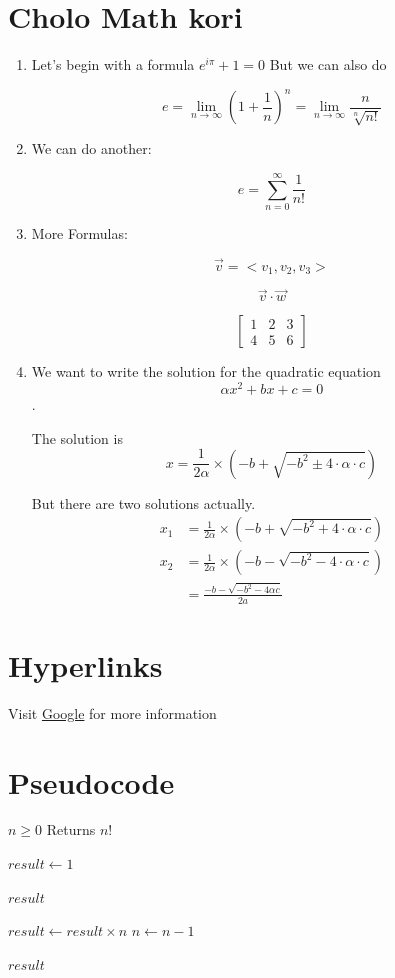 \documentclass{article}
\begin{document}
\section{Cholo Math kori}
\begin{enumerate}
\item Let's begin with a formula $e^{i\pi} + 1 = 0$ But we can also do

$$ e = \lim_{n\to\infty} \left(1+\frac{1}{n}\right)^n = \lim_{n\to\infty}\frac{n}{\sqrt[n]{n!}}$$

\item We can do another:

$$ e = \sum_{n=0}^{\infty}\frac{1}{n!}$$

\item More Formulas:

$$  \vec{v} = <v_1,v_2,v_3>$$

$$\vec{v}\cdot \vec{w}$$

$$\begin{bmatrix}
    1 & 2 & 3 \\
    4 & 5 & 6
\end{bmatrix}$$

\item We want to write the solution for the quadratic equation $$\alpha x^2 + bx + c = 0$$. 

The solution is 
$$ x = \frac{1}{2\alpha} \times \left(-b + \sqrt{-b^2 \pm 4\cdot \alpha \cdot c}\right) $$

But there are two solutions actually.
\begin{align*}
 x_1 & = \frac{1}{2\alpha} \times \left(-b + \sqrt{-b^2 + 4\cdot \alpha \cdot c}\right)  \\ 
 x_2 & = \frac{1}{2\alpha} \times \left(-b - \sqrt{-b^2 - 4\cdot \alpha \cdot c}\right) \\
 & = \frac{-b - \sqrt{-b^2 - 4 \alpha c}}{2a}
\end{align*}
\end{enumerate}

\section{Hyperlinks}
Visit \href{www.google.com}{Google} for more information

\section{Pseudocode}
\begin{algorithm}[ht]
\caption{Calculate Factorial}
\label{alg:factorial}
\begin{algorithmic}[1] %
    \Require $n \geq 0$
    \Ensure Returns $n!$
    
    \State $result \gets 1$
    
        \State \Return $result$
    \EndIf
    
        \State $result \gets result \times n$
        \State $n \gets n - 1$
    \EndWhile
    
    \State \Return $result$
\end{algorithmic}
\end{algorithm}
\end{document}
